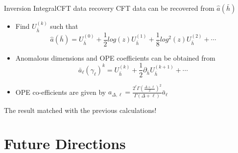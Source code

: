 \documentclass[pdf]{beamer}
\begin{document}
                \begin{frame}[t]{Inversion Integral}{CFT data recovery}
                    CFT data can be recovered from $\hat{a}(\bar{h})$
                    \begin{itemize}
                        \item <3-> Find $U_{\bar{h}}^{(k)}$ such that
                        \begin{equation*}
                            \hat{a}(\bar{h}) = U_{\bar{h}}^{(0)} + \frac{1}{2}log(z)U_{\bar{h}}^{(1)}+ \frac{1}{8}log^2(z)U_{\bar{h}}^{(2)} + \cdots
                        \end{equation*} 
                        \item <4-> Anomalous dimensions and OPE coefficients can be obtained from
                        \begin{equation*}
                            \bar{a}_{\ell}(\gamma_{\ell})^k = U_{\bar{h}}^{(k)} + \frac{1}{2}\partial_{\bar{h}}U_{\bar{h}}^{(k+1)}+\cdots
                        \end{equation*}
                        \item <5-> OPE co-efficients are given by $a_{\Delta,\ell} = \frac{2^{\ell}\Gamma(\frac{\Delta+\ell}{2})^2}{\Gamma(\Delta+\ell)}\bar{a}_{\ell}$
                    \end{itemize}
                    \vspace{10pt}
                    \centering
                    \Large
                    The result matched with the previous calculations!
                \end{frame}
        \section{Future Directions}
\end{document}
